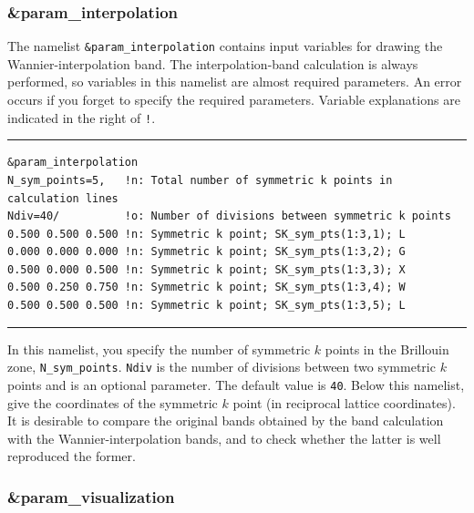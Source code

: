 \documentclass{article}
\begin{document}
\subsubsection{\&param\_interpolation}  
The namelist \verb+&param_interpolation+ contains input variables for drawing the Wannier-interpolation band. The interpolation-band calculation is always performed, so variables in this namelist are almost required parameters. An error occurs if you forget to specify the required parameters. Variable explanations are indicated in the right of \verb+!+. 
\vspace{5mm}\hrule
\begin{verbatim}
&param_interpolation   
N_sym_points=5,   !n: Total number of symmetric k points in calculation lines
Ndiv=40/          !o: Number of divisions between symmetric k points
0.500 0.500 0.500 !n: Symmetric k point; SK_sym_pts(1:3,1); L
0.000 0.000 0.000 !n: Symmetric k point; SK_sym_pts(1:3,2); G
0.500 0.000 0.500 !n: Symmetric k point; SK_sym_pts(1:3,3); X
0.500 0.250 0.750 !n: Symmetric k point; SK_sym_pts(1:3,4); W
0.500 0.500 0.500 !n: Symmetric k point; SK_sym_pts(1:3,5); L 
\end{verbatim}
\hrule\vspace{3mm}
In this namelist, you specify the number of symmetric $k$ points in the Brillouin zone, \verb+N_sym_points+. \verb+Ndiv+ is the number of divisions between two symmetric $k$ points and is an optional parameter. The default value is \verb+40+. Below this namelist, give the coordinates of the symmetric $k$ point (in reciprocal lattice coordinates). It is desirable to compare the original bands obtained by the band calculation with the Wannier-interpolation bands, and to check whether the latter is well reproduced the former.

\subsubsection{\&param\_visualization} 
\end{document}

